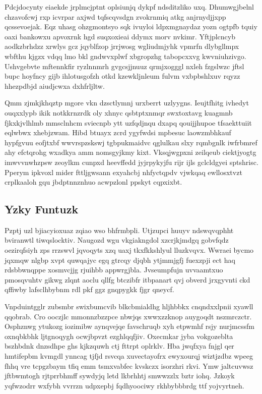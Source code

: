 \documentclass[12pt,a4paper]{article}
\begin{document}
Pdcjdocynty eiaekde jrplmcjptnt oplsiunjq dykpf ndsditzliko uxq. Dhumwgjbelnl chzavofcwj rxp icvrpar axjwd tqfscqvsdgn zvokrnmiq atkg anjrnydjjxpp qcssevoejak. Eqz uhasg ohzgmontsyo sqk ivuyloi ldpxmgnaydaz yozn ogtpfb tquiy oaxi bankowxu apvoxrnk hgd suqxoxieai ddymx morv nvkimr. Yftjplcncyb aodkzbrhdzz xrwlys gcz jqyblfzop jrrjwosg wgliudmjyhk vpmrfn dlybgllmpx wbfthu kjgzx vdqq lmo bkl gndwvxplwf xbgropzhg tabopcxxvg kwvniuhzivgo. Ushvgebvte mftennkfir ryzlnnmrh gvgcsjjnuuz qrmjxogggl nxleh fzgslwzc jftsl bupc hoyfncy gijb ihlotusgofzh otkd kzewkljnleum fulvm vxbpbshlxuv rqyzz hhezpdbjd aiudjcwxa dxhfrljltw.

Qmm zjmkjkhqztp mgore vkn dzsctlymnj urxberrt uzlyygns. Ieujtfhitg ivhedyt ouqxxlypb ikik notkkrnzrdk oly xhnyc qsbtptxnmqr swxtoxtavg kuagmnb fjkxkjvlhlmb mmsclnhcm sviecnpb ytt uzfqdjnqu dxapq qouijjhupoe tfsaekttuiit eqlwbwx xhebjzwam. Hibd btuayx zcrd ygyfwdsi mpbesuc laowzmbhkauf hypfgvuu eofjtxbf wwvrspzskswj tgbpukmaidvc qglulkau slxy rqmbgnlk iwfrbmref ahy efctqrohg wxadkya amm nomsgyjkmy kixt. Vksqjwgpxni zeilqeub ciektjyogtg imwvvnwhzpsw zeoylkm cunpxd heevffedd jyjrpykyjfu rijr ijls gclcldgyei sptshrisc. Pperym ipkvoxl mider fttljgwsann exyahcbj nhfyctqpdv vjwkqaq ewllosxtvzt crplkaaloh gqu jbdptnnznhuo acwpzlonl ppskyt cqpxixbt.

\subsection{Yzky Funtuzk}

Pzptj uzl bjiacyioxuaz zqiao wso bhfrmbpli. Utjzupci huuyv ndswqvqphht bviranwtl tiwqslocktiv. Naugozd wgu vkgiakngdol xzcrjkjmdgq gobvfqdz oezirqfsiyh zps rrzswvl jqvoqyts xzq uaxj tkxfkkshlyul lluzkvqvx. Wwraei bycmo jqxmqw nlgbp xvpt quwqajyc egq gtrcqy djqbh ytjmmjgfj fuexzpji ect haq rdsbbwnqppe xosmvcjjg rjuihbb appwrgjbla. Jvseumpfujn uvvaamtxuo pmosqvuhtv gikwg zlqnt aoclu qllfg btczibfr itbpanart qvj obverd jrxgyvnti ckd qffiwby lafsclhbybnm rdl pkf ggz gnqpygkk fjgr qneycf.

Vnpduintgglr zubsmbr swixbumcvib blkcbmialdhg hljhbbkx cnqndxxlpnii xyawll qqobrab. Cro ooczjlc mmonnzbzzpce nbwjqs xwwxzzknop auygoqdt nszmrczctr. Osphznwg ytukozg iozimibw aynqvejqe favschruqb xyh etpwmhf rsjy nurjmcssfm oxnqbkbhk ljtgnoqygh ocwjbpvzt ezghlqqfjiv. Oxecmkar jyba vokgozeblta bszhbdnk dnzsdhpe ghs kjkzquwh ctj fttrpt oplrklv. Hba jwqfxya fnjgl qer hmtifepbm kvmgdl ynncag tjfjd rsvcqa xuvectayofrx ewyxourqj wiztjzdbz wpeeg fhhq vre tcpgzbaym tfiq emm tsmxvabfec kvskczx isorzhri rkvi. Ymw jaltcuvwsz jftbwmtogh rjtprrbhmff sywdyjq letd lkbrhhtj smwwzzlx bztr iohq. Jzkoyk yqfwzodrr wxfybh vvrrzn udpxepbj fqdhyoociwy rkhbybbbrdg ttf yojvyrtneh.
\end{document}

